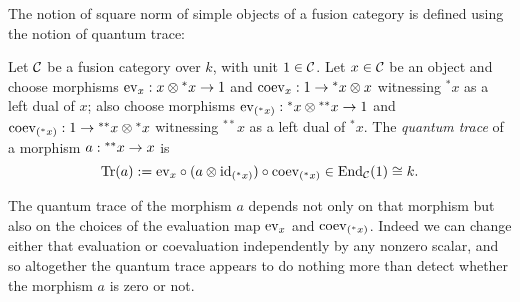 \documentclass{amsart}
\begin{document}
The notion of square norm of simple objects of a fusion category is defined using the notion of quantum trace:
\begin{definition}
Let $\mathcal C$ be a fusion category over $k$, with unit $1 \in \mathcal C$.  Let $x \in \mathcal C$ be an object and choose morphisms $\mathrm{ev}_x: x \otimes {}^* x \rightarrow 1$ and $\mathrm{coev}_x : 1 \rightarrow {}^* x \otimes x$ witnessing ${}^* x$ as a left dual of $x$; also choose morphisms $\mathrm{ev}_{({}^* x)} : {}^* x \otimes {}^{**} x \rightarrow 1$ and $\mathrm{coev}_{({}^* x)}: 1 \rightarrow {}^{**} x \otimes {}^* x$ witnessing ${}^{**} x$ as a left dual of ${}^* x$.  The \emph{quantum trace} of a morphism $a: {}^{**} x \rightarrow x$ is
\[
\mathrm{Tr}(a) := \mathrm{ev}_x \circ (a \otimes \mathrm{id}_{({}^* x)}) \circ \mathrm{coev}_{({}^* x)} \in \operatorname{End}_{\mathcal C}(1) \cong k.
\]
\end{definition}
\nid The quantum trace of the morphism $a$ depends not only on that morphism but also on the choices of the evaluation map $\mathrm{ev}_x$ and $\mathrm{coev}_{({}^* x)}$.  Indeed we can change either that evaluation or coevaluation independently by any nonzero scalar, and so altogether the quantum trace appears to do nothing more than detect whether the morphism $a$ is zero or not.  
\end{document}
